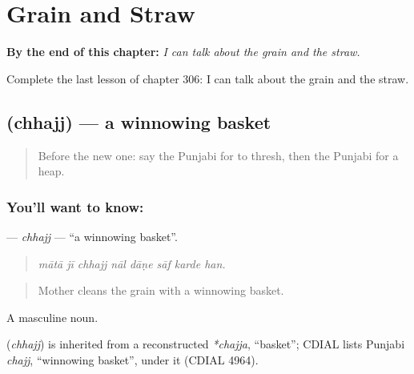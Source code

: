 
\chapter{Grain and Straw}
\label{ch:pa-a2-grain-and-straw}

\begin{chapteropening}
\textbf{By the end of this chapter:} \emph{I can talk about the grain and the straw.}

Complete the last lesson of chapter 306: I can talk about the grain and the straw.
\end{chapteropening}

\section[\texorpdfstring{\pa{ਛੱਜ} (chhajj)}{ਛੱਜ (chhajj)}]{ (chhajj) — a winnowing basket}

\label{lesson:PA-C306-chhajj}



\begin{quote}
Before the new one: say the Punjabi for to thresh, then the Punjabi for a heap.
\end{quote}

\subsection*{You'll want to know: }
\textbf{} — \emph{chhajj} — \textquotedblleft{}a winnowing basket\textquotedblright{}.

\begin{quote}
       
\end{quote}

\begin{quote}
\emph{mātā jī chhajj nāl dāṇe sāf karde han.}
\end{quote}

\begin{quote}
Mother cleans the grain with a winnowing basket.
\end{quote}

A masculine noun.

\begin{cousinweb}
\textbf{} (\emph{chhajj}) is inherited from a reconstructed \emph{*chajja}, \textquotedblleft{}basket\textquotedblright{}; CDIAL lists Punjabi \emph{chajj}, \textquotedblleft{}winnowing basket\textquotedblright{}, under it (CDIAL 4964).
\end{cousinweb}

